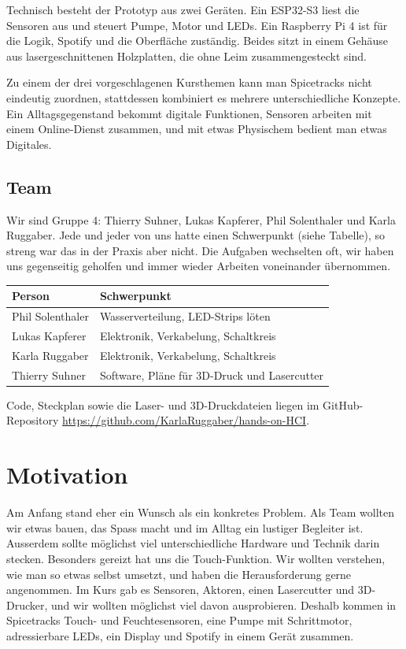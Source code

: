 \documentclass[11pt,a4paper]{article}
\begin{document}
Technisch besteht der Prototyp aus zwei Geräten. Ein ESP32-S3 liest die Sensoren aus und steuert Pumpe, Motor und LEDs. Ein Raspberry Pi 4 ist für die Logik, Spotify und die Oberfläche zuständig. Beides sitzt in einem Gehäuse aus lasergeschnittenen Holzplatten, die ohne Leim zusammengesteckt sind.

Zu einem der drei vorgeschlagenen Kursthemen kann man Spicetracks nicht eindeutig zuordnen, stattdessen kombiniert es mehrere unterschiedliche Konzepte. Ein Alltagsgegenstand bekommt digitale Funktionen, Sensoren arbeiten mit einem Online-Dienst zusammen, und mit etwas Physischem bedient man etwas Digitales.

\subsection{Team}

Wir sind Gruppe 4: Thierry Suhner, Lukas Kapferer, Phil Solenthaler und Karla Ruggaber. Jede und jeder von uns hatte einen Schwerpunkt (siehe Tabelle), so streng war das in der Praxis aber nicht. Die Aufgaben wechselten oft, wir haben uns gegenseitig geholfen und immer wieder Arbeiten voneinander übernommen.

\begin{table}[H]
\centering
\begin{tabularx}{\linewidth}{lL}
\toprule
\textbf{Person} & \textbf{Schwerpunkt} \\
\midrule
Phil Solenthaler & Wasserverteilung, LED-Strips löten \\
Lukas Kapferer & Elektronik, Verkabelung, Schaltkreis \\
Karla Ruggaber & Elektronik, Verkabelung, Schaltkreis \\
Thierry Suhner & Software, Pläne für 3D-Druck und Lasercutter \\
\bottomrule
\end{tabularx}
\end{table}

Code, Steckplan sowie die Laser- und 3D-Druckdateien liegen im GitHub-Repository \url{https://github.com/KarlaRuggaber/hands-on-HCI}.


\section{Motivation}

Am Anfang stand eher ein Wunsch als ein konkretes Problem. Als Team wollten wir etwas bauen, das Spass macht und im Alltag ein lustiger Begleiter ist. Ausserdem sollte möglichst viel unterschiedliche Hardware und Technik darin stecken. Besonders gereizt hat uns die Touch-Funktion. Wir wollten verstehen, wie man so etwas selbst umsetzt, und haben die Herausforderung gerne angenommen. Im Kurs gab es Sensoren, Aktoren, einen Lasercutter und 3D-Drucker, und wir wollten möglichst viel davon ausprobieren. Deshalb kommen in Spicetracks Touch- und Feuchtesensoren, eine Pumpe mit Schrittmotor, adressierbare LEDs, ein Display und Spotify in einem Gerät zusammen.
\end{document}
